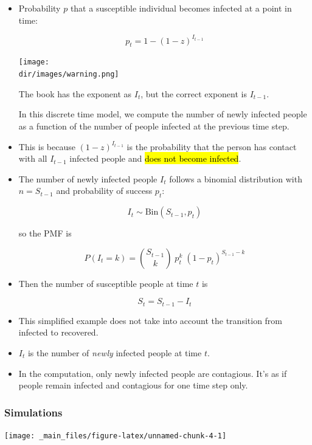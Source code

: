\documentclass[
  11pt]{report}
\newcommand{\dir}{/ssd/R/x86_64-pc-linux-gnu-library/4.1/fnaufelRmd/rmarkdown/resources}
\newenvironment{rmdwarning}
{
  \begin{mywarning}
    \texttt{[image: \\dir/images/warning.png]}
    \tcblower
  }
  {
  \end{mywarning}
}
\begin{document}
\begin{itemize}
\item
  Probability $p$ that a susceptible individual becomes infected at a point in time:

  \[
  p_t = 1 - (1 - z)^{I_{t-1}}
  \]

  \begin{rmdwarning}
  The book has the exponent as $I_{t}$, but the correct exponent is $I_{t - 1}$.

  In this discrete time model, we compute the number of newly infected people as a function of the number of people infected at the previous time step.

  \end{rmdwarning}
\item
  This is because $(1 - z)^{I_{t - 1}}$ is the probability that the person has contact with all $I_{t-1}$ infected people and {\hl{does not become infected}}.
\item
  The number of newly infected people $I_{t}$ follows a binomial distribution with $n = S_{t-1}$ and probability of success $p_t$:

  \[
  I_{t} \sim \text{Bin}(S_{t-1}, p_t)
  \]

  so the PMF is

  \[
  P(I_{t} = k) = \binom{S_{t-1}}{k} \; p_t^k \; (1 - p_t)^{S_{t-1} - k}
  \]
\item
  Then the number of susceptible people at time $t$ is

  \[
  S_{t} = S_{t-1} - I_{t}
  \]
\item
  This simplified example does not take into account the transition from infected to recovered.
\item
  $I_t$ is the number of \emph{newly} infected people at time $t$.
\item
  In the computation, only newly infected people are contagious. It's as if people remain infected and contagious for one time step only.
\end{itemize}

\hypertarget{simulations}{%
\subsubsection*{Simulations}\label{simulations}}

\begin{center}\texttt{[image: \_main\_files/figure-latex/unnamed-chunk-4-1]} \end{center}
\end{document}
